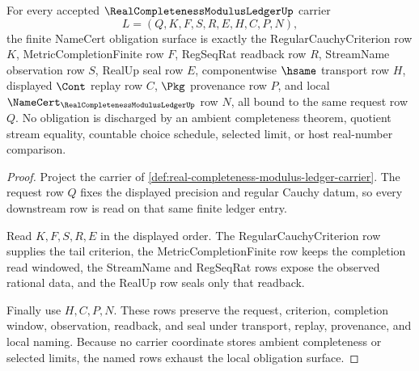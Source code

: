 \begin{theorem}
\label{thm:real-completeness-modulus-ledger-namecert-obligations}
For every accepted $\RealCompletenessModulusLedgerUp$ carrier
$$
L=(Q,K,F,S,R,E,H,C,P,N),
$$
the finite NameCert obligation surface is exactly the RegularCauchyCriterion row $K$, MetricCompletionFinite row $F$, RegSeqRat readback row $R$, StreamName observation row $S$, RealUp seal row $E$, componentwise $\hsame$ transport row $H$, displayed $\Cont$ replay row $C$, $\Pkg$ provenance row $P$, and local $\NameCert_{\RealCompletenessModulusLedgerUp}$ row $N$, all bound to the same request row $Q$. No obligation is discharged by an ambient completeness theorem, quotient stream equality, countable choice schedule, selected limit, or host real-number comparison.
\end{theorem}
\begin{proof}
Project the carrier of \autoref{def:real-completeness-modulus-ledger-carrier}. The request row $Q$ fixes the displayed precision and regular Cauchy datum, so every downstream row is read on that same finite ledger entry.

Read $K,F,S,R,E$ in the displayed order. The RegularCauchyCriterion row supplies the tail criterion, the MetricCompletionFinite row keeps the completion read windowed, the StreamName and RegSeqRat rows expose the observed rational data, and the RealUp row seals only that readback.

Finally use $H,C,P,N$. These rows preserve the request, criterion, completion window, observation, readback, and seal under transport, replay, provenance, and local naming. Because no carrier coordinate stores ambient completeness or selected limits, the named rows exhaust the local obligation surface.
\end{proof}

